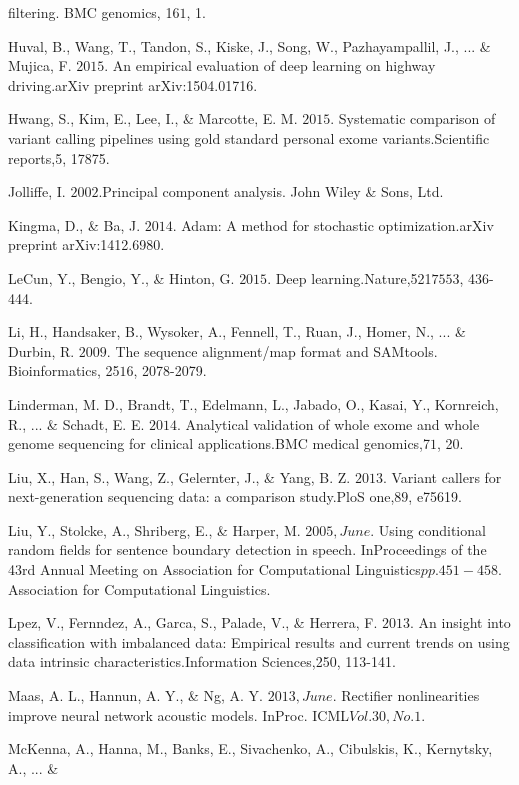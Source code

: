 \documentclass{article}
\begin{document}
\begin{list}{}{%
\setlength{\topsep}{0pt}%
\setlength{\leftmargin}{0.5in}%
\setlength{\listparindent}{-0.5in}%
\setlength{\itemindent}{-0.5in}%
\setlength{\parsep}{\parskip}%
}
filtering. BMC genomics, 16\(1\), 1.\\\item[] Huval, B., Wang, T., Tandon, S., Kiske, J., Song, W., Pazhayampallil, J., ... \& Mujica, F. \(2015\). An empirical evaluation of deep learning on highway driving.arXiv preprint arXiv:1504.01716.\\\item[] Hwang, S., Kim, E., Lee, I., \& Marcotte, E. M. \(2015\). Systematic comparison of variant calling pipelines using gold standard personal exome variants.Scientific reports,5, 17875.\\\item[] Jolliffe, I. \(2002\).Principal component analysis. John Wiley \& Sons, Ltd.\\\item[] Kingma, D., \& Ba, J. \(2014\). Adam: A method for stochastic optimization.arXiv preprint arXiv:1412.6980.\\\item[] LeCun, Y., Bengio, Y., \& Hinton, G. \(2015\). Deep learning.Nature,521\(7553\), 436-444.\\\item[] Li, H., Handsaker, B., Wysoker, A., Fennell, T., Ruan, J., Homer, N., ... \& Durbin, R. \(2009\). The sequence alignment/map format and SAMtools. Bioinformatics, 25\(16\), 2078-2079.\\\item[] Linderman, M. D., Brandt, T., Edelmann, L., Jabado, O., Kasai, Y., Kornreich, R., ... \& Schadt, E. E. \(2014\). Analytical validation of whole exome and whole genome sequencing for clinical applications.BMC medical genomics,7\(1\), 20.\\\item[] Liu, X., Han, S., Wang, Z., Gelernter, J., \& Yang, B. Z. \(2013\). Variant callers for next-generation sequencing data: a comparison study.PloS one,8\(9\), e75619.\\\item[] Liu, Y., Stolcke, A., Shriberg, E., \& Harper, M. \(2005, June\). Using conditional random fields for sentence boundary detection in speech. InProceedings of the 43rd Annual Meeting on Association for Computational Linguistics\(pp. 451-458\). Association for Computational Linguistics.\\\item[] Lpez, V., Fernndez, A., Garca, S., Palade, V., \& Herrera, F. \(2013\). An insight into classification with imbalanced data: Empirical results and current trends on using data intrinsic characteristics.Information Sciences,250, 113-141.\\\item[] Maas, A. L., Hannun, A. Y., \& Ng, A. Y. \(2013, June\). Rectifier nonlinearities improve neural network acoustic models. InProc. ICML\(Vol. 30, No. 1\).\\\item[] McKenna, A., Hanna, M., Banks, E., Sivachenko, A., Cibulskis, K., Kernytsky, A., ... \& 
\end{list}
\end{document}
